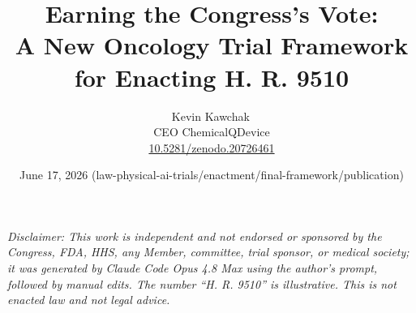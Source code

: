 \documentclass[11pt]{article}
\title{Earning the Congress's Vote:\\A New Oncology Trial Framework for Enacting H. R. 9510}
\author{Kevin Kawchak\,\orcidicon{0009-0007-5457-8667}\\ CEO ChemicalQDevice\\ \href{https://doi.org/10.5281/zenodo.20726461}{10.5281/zenodo.20726461}}
\date{June 17, 2026 (law-physical-ai-trials/enactment/final-framework/publication)}
\begin{document}
\maketitle
\thispagestyle{empty}

\begin{abstract}

\end{abstract}

\vspace{0.2em}\noindent\footnotesize\textit{Disclaimer: This work is independent and
not endorsed or sponsored by the Congress, FDA, HHS, any Member, committee, trial
sponsor, or medical society; it was generated by Claude Code Opus 4.8 Max using the
author's prompt, followed by manual edits. The number ``H. R. 9510'' is
illustrative. This is not enacted law and not legal advice.}\normalsize\par




\tableofcontents
\vspace{0.3cm}












{}
\begingroup\raggedright\nocite{*}\endgroup


\end{document}
